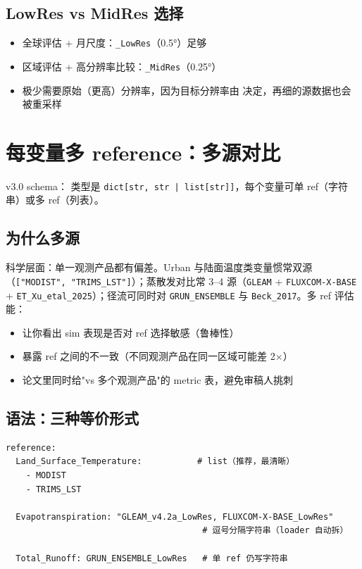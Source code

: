 \subsection{LowRes vs MidRes 选择}

\begin{itemize}
  \item 全球评估 + 月尺度：\texttt{\_LowRes}（0.5°）足够
  \item 区域评估 + 高分辨率比较：\texttt{\_MidRes}（0.25°）
  \item 极少需要原始（更高）分辨率，因为目标分辨率由  决定，再细的源数据也会被重采样
\end{itemize}

\section{每变量多 reference：多源对比}

\openbench{} v3.0 schema： 类型是 \texttt{dict[str, str | list[str]]}，每个变量可单 ref（字符串）或多 ref（列表）。

\subsection{为什么多源}

科学层面：单一观测产品都有偏差。Urban 与陆面温度类变量惯常双源（\texttt{["MODIST", "TRIMS\_LST"]}）；蒸散发对比常 3--4 源（\texttt{GLEAM} + \texttt{FLUXCOM-X-BASE} + \texttt{ET\_Xu\_etal\_2025}）；径流可同时对 \texttt{GRUN\_ENSEMBLE} 与 \texttt{Beck\_2017}。多 ref 评估能：

\begin{itemize}
  \item 让你看出 sim 表现是否对 ref 选择敏感（鲁棒性）
  \item 暴露 ref 之间的不一致（不同观测产品在同一区域可能差 2$\times$）
  \item 论文里同时给"vs 多个观测产品"的 metric 表，避免审稿人挑刺
\end{itemize}

\subsection{语法：三种等价形式}

\begin{verbatim}
reference:
  Land_Surface_Temperature:           # list（推荐，最清晰）
    - MODIST
    - TRIMS_LST

  Evapotranspiration: "GLEAM_v4.2a_LowRes, FLUXCOM-X-BASE_LowRes"
                                       # 逗号分隔字符串（loader 自动拆）

  Total_Runoff: GRUN_ENSEMBLE_LowRes   # 单 ref 仍写字符串
\end{verbatim}

